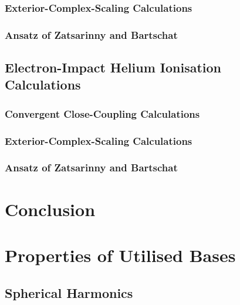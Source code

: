 \documentclass[draft]{article}
\begin{document}
\subsubsection{Exterior-Complex-Scaling Calculations}
\label{sec:e-h-ecs-calculations}

\subsubsection{Ansatz of Zatsarinny and Bartschat}
\label{sec:e-h-ecs-calculations}

\subsection{Electron-Impact Helium Ionisation Calculations}
\label{sec:e-he-ionisation-calculations}

\subsubsection{Convergent Close-Coupling Calculations}
\label{sec:e-he-ccc-calculations}

\subsubsection{Exterior-Complex-Scaling Calculations}
\label{sec:e-he-ecs-calculations}

\subsubsection{Ansatz of Zatsarinny and Bartschat}
\label{sec:e-he-ecs-calculations}

\section{Conclusion}
\label{sec:conclusion}

\clearpage





\clearpage

\appendix

\section{Properties of Utilised Bases}
\label{app:properties}

\subsection{Spherical Harmonics}
\label{app:spherical-harmonics}
\end{document}
